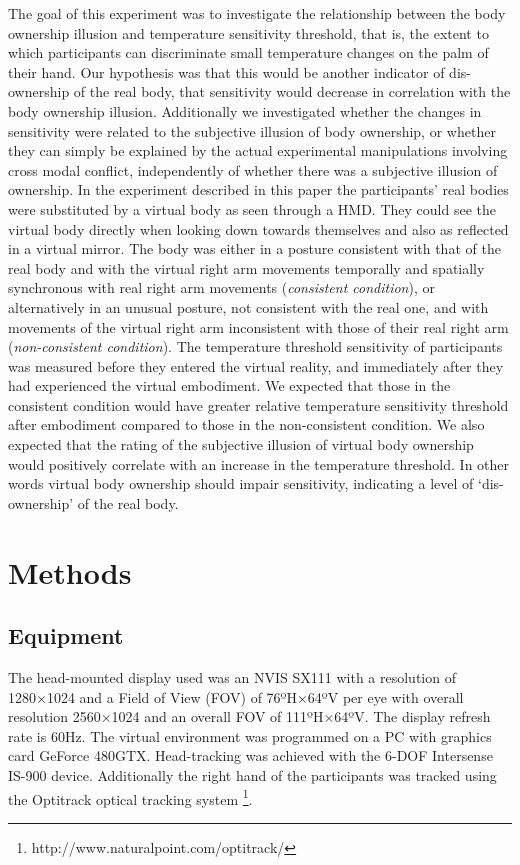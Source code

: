 \documentclass[
		twoside,openright,titlepage,numbers=noenddot,manychapters,
		headinclude,%
                footinclude=false,cleardoublepage=empty,
                BCOR=5mm,
		fontsize=11pt, %
                 enabledeprecatedfontcommands]{scrreprt}
\begin{document}
The goal of this experiment was to investigate the relationship between the body ownership illusion and temperature sensitivity threshold, that is, the extent to which participants can discriminate small temperature changes on the palm of their hand. Our hypothesis was that this would be another indicator of dis-ownership of the real body, that sensitivity would decrease in correlation with the body ownership illusion. Additionally we investigated whether the changes in sensitivity were related to the subjective illusion of body ownership, or whether they can simply be explained by the actual experimental manipulations involving cross modal conflict, independently of whether there was a subjective illusion of ownership. 
In the experiment described in this paper the participants’ real bodies were substituted by a virtual body as seen through a HMD. They could see the virtual body directly when looking down towards themselves and also as reflected in a virtual mirror. The body was either in a posture consistent with that of the real body and with the virtual right arm movements temporally and spatially synchronous with real right arm movements (\emph{consistent condition}), or alternatively in an unusual posture, not consistent with the real one, and with movements of the virtual right arm inconsistent with those of their real right arm (\emph{non-consistent condition}). The temperature threshold sensitivity of participants was measured before they entered the virtual reality, and immediately after they had experienced the virtual embodiment. We expected that those in the consistent condition would have greater relative temperature sensitivity threshold after embodiment compared to those in the non-consistent condition. We also expected that the rating of the subjective illusion of virtual body ownership would positively correlate with an increase in the temperature threshold. In other words virtual body ownership should impair sensitivity, indicating a level of ‘dis-ownership’ of the real body.

\section{Methods}
\label{methods_exp2}
\subsection{Equipment}

The head-mounted display used was an NVIS SX111 with a resolution of 1280×1024 and a Field of View (FOV) of 76ºH×64ºV per eye with overall resolution 2560×1024 and an overall FOV of 111ºH×64ºV. The display refresh rate is 60Hz. The virtual environment was programmed on a PC with graphics card GeForce 480GTX. Head-tracking was achieved with the 6-DOF Intersense IS-900 device. Additionally the right hand of the participants was tracked using the Optitrack optical tracking system \footnote{http://www.naturalpoint.com/optitrack/}. 
\end{document}
